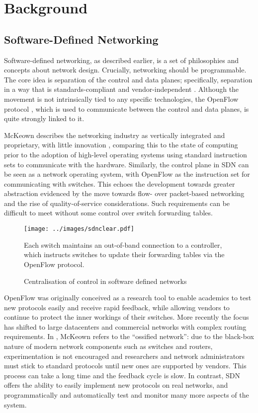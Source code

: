 \chapter{Background}
\label{ch:background}

\section{Software-Defined Networking}
Software-defined networking, as described earlier, is a set of philosophies and concepts about network design. Crucially, networking should be programmable. The core idea is separation of the control and data planes; specifically, separation in a way that is standards-compliant and vendor-independent \cite{onf:sdn}. Although the movement is not intrinsically tied to any specific technologies, the OpenFlow protocol \cite{onf:switch140}, which is used to communicate between the control and data planes, is quite strongly linked to it.

McKeown describes the networking industry as vertically integrated and proprietary, with little innovation \cite{mckeown:sdn}, comparing this to the state of computing prior to the adoption of high-level operating systems using standard instruction sets to communicate with the hardware. Similarly, the control plane in SDN can be seen as a network operating system, with OpenFlow as the instruction set for communicating with switches. This echoes the development towards greater abstraction evidenced by the move towards flow- over packet-based networking and the rise of quality-of-service considerations. Such requirements can be difficult to meet without some control over switch forwarding tables.

\begin{figure}
  \centering
  \texttt{[image: ../images/sdnclear.pdf]}
  \caption{Centralisation of control in software defined networks}
  Each switch maintains an out-of-band connection to a controller, which instructs switches to update their forwarding tables via the OpenFlow protocol.
  \label{fig:sdn}
\end{figure}

OpenFlow was originally conceived \cite{mckeown:openflow} as a research tool to enable academics to test new protocols easily and receive rapid feedback, while allowing vendors to continue to protect the inner workings of their switches. More recently \cite{onf:sdn} the focus has shifted to large datacenters and commercial networks with complex routing requirements. In \cite{mckeown:sdn}, McKeown refers to the  ``ossified network'': due to the black-box nature of modern network components such as switches and routers, experimentation is not encouraged and researchers and network administrators must stick to standard protocols until new ones are supported by vendors. This process can take a long time and the feedback cycle is slow. In contrast, SDN offers the ability to easily implement new protocols on real networks, and programmatically and automatically test and monitor many more aspects of the system.

